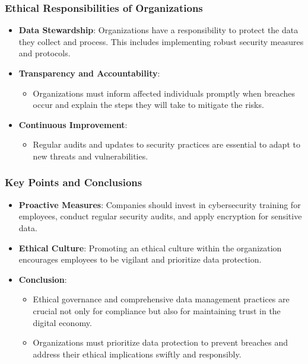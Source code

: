 \documentclass[aspectratio=169]{beamer}
\begin{document}
\begin{frame}[fragile]
    \frametitle{Ethical Responsibilities of Organizations}
    \begin{itemize}
        \item \textbf{Data Stewardship}: Organizations have a responsibility to protect the data they collect and process. This includes implementing robust security measures and protocols.
        
        \item \textbf{Transparency and Accountability}:
            \begin{itemize}
                \item Organizations must inform affected individuals promptly when breaches occur and explain the steps they will take to mitigate the risks.
            \end{itemize}
        
        \item \textbf{Continuous Improvement}:
            \begin{itemize}
                \item Regular audits and updates to security practices are essential to adapt to new threats and vulnerabilities.
            \end{itemize}
    \end{itemize}
\end{frame}

\begin{frame}[fragile]
    \frametitle{Key Points and Conclusions}
    \begin{itemize}
        \item \textbf{Proactive Measures}: Companies should invest in cybersecurity training for employees, conduct regular security audits, and apply encryption for sensitive data.
        
        \item \textbf{Ethical Culture}: Promoting an ethical culture within the organization encourages employees to be vigilant and prioritize data protection.
        
        \item \textbf{Conclusion}:
            \begin{itemize}
                \item Ethical governance and comprehensive data management practices are crucial not only for compliance but also for maintaining trust in the digital economy. 
                \item Organizations must prioritize data protection to prevent breaches and address their ethical implications swiftly and responsibly.
            \end{itemize}
    \end{itemize}
\end{frame}
\end{document}
